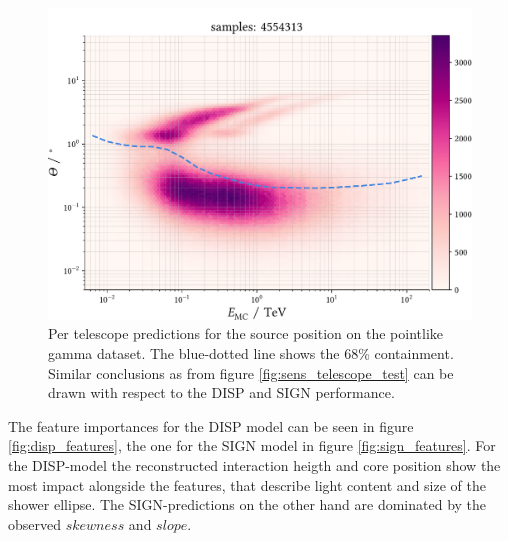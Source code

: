 \begin{figure}
    \centering
    \captionsetup{width=0.9\linewidth}
    \includegraphics[width=.9\textwidth]{../analysis/plots/gamma/tel_vs_energy.pdf}
    \caption{Per telescope predictions for the source position on the pointlike 
    gamma dataset. The blue-dotted line shows the 68\% containment. 
    Similar conclusions as from figure \ref{fig:sens_telescope_test} can be drawn
    with respect to the DISP and SIGN performance.}
    \label{fig:sens_telescope}
\end{figure}


The feature importances for the DISP model can be seen in figure \ref{fig:disp_features},
the one for the SIGN model in figure \ref{fig:sign_features}.
For the DISP-model the reconstructed interaction heigth and core position
show the most impact alongside the features, that describe light content and size of
the shower ellipse. 
The SIGN-predictions on the other hand are dominated by the observed 
$skewness$ and $slope$.

